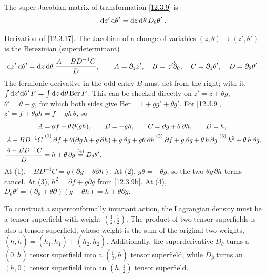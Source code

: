 The super-Jacobian matrix of transformation \eqref{12.3.9} is
\begin{equation}
	\mathrm{d} z^{\prime}\,\mathrm{d}\theta^{\prime} = \mathrm{d} z\,\mathrm{d}\theta\,D_{\theta}\theta^{\prime}\:. \label{12.3.17}
\end{equation}
\begin{tcolorbox}[breakable]
	\begin{remark}
		Derivation of \eqref{12.3.17}. The Jacobian of a change of variables $(z,\theta)\to(z',\theta')$ is the Berezinian (superdeterminant)
		\[
		\mathrm{d} z'\,\mathrm{d}\theta'=\mathrm{d} z\,\mathrm{d}\theta\;\frac{A-BD^{-1}C}{D},\qquad
		A=\partial_{z}z',\quad B=z'\overleftarrow{\partial_{\theta}},\quad C=\partial_{z}\theta',\quad D=\partial_{\theta}\theta' .
		\]
		The fermionic derivative in the odd entry $B$ must act from the right; with it, $\int\mathrm{d} z'\mathrm{d}\theta'\,F=\int\mathrm{d} z\,\mathrm{d}\theta\,\mathrm{Ber}\,F$. This can be checked directly on $z'=z+\theta g$, $\theta'=\theta+g$, for which both sides give $\mathrm{Ber}=1+gg'+\theta g'$. For \eqref{12.3.9}, $z'=f+\theta gh=f-gh\,\theta$, so
		\begin{align*}
			A&=\partial f+\theta\,\partial(gh),\qquad B=-gh,\qquad C=\partial g+\theta\,\partial h,\qquad D=h,\\
			A-BD^{-1}C&\overset{(1)}{=} \partial f+\theta(\partial g\,h+g\,\partial h)+g\,\partial g+g\theta\,\partial h
			\overset{(2)}{=} \partial f+g\,\partial g+\theta\,h\,\partial g
			\overset{(3)}{=} h^{2}+\theta\,h\,\partial g ,\\
			\frac{A-BD^{-1}C}{D}&=h+\theta\,\partial g
			\overset{(4)}{=} D_{\theta}\theta' .
		\end{align*}
		At (1), $-BD^{-1}C=g(\partial g+\theta\partial h)$. At (2), $g\theta=-\theta g$, so the two $\theta g\,\partial h$ terms cancel. At (3), $h^{2}=\partial f+g\partial g$ from \eqref{12.3.9b}. At (4), $D_{\theta}\theta'=(\partial_{\theta}+\theta\partial)(g+\theta h)=h+\theta\partial g$.
	\end{remark}
\end{tcolorbox}
To construct a superconformally invariant action, the Lagrangian density must be a tensor superfield with weight $(\tfrac{1}{2},\tfrac{1}{2})$. The product of two tensor superfields is also a tensor superfield, whose weight is the sum of the original two weights, $(h,\tilde{h})=(h_{1},\tilde{h}_{1})+(h_{2},\tilde{h}_{2})$. Additionally, the superderivative $D_{\theta}$ turns a $(0,\tilde{h})$ tensor superfield into a $(\tfrac{1}{2},\tilde{h})$ tensor superfield, while $D_{\bar{\theta}}$ turns an $(h,0)$ tensor superfield into an $(h,\tfrac{1}{2})$ tensor superfield.

